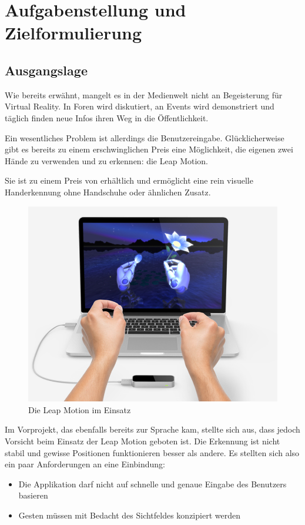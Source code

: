 \chapter{Aufgabenstellung und Zielformulierung}

\section{Ausgangslage}

Wie bereits erwähnt, mangelt es in der Medienwelt nicht an Begeisterung für Virtual Reality. In Foren wird diskutiert, an Events wird demonstriert und täglich finden neue Infos ihren Weg in die Öffentlichkeit.

Ein wesentliches Problem ist allerdings die Benutzereingabe. Glücklicherweise gibt es bereits zu einem erschwinglichen Preis eine Möglichkeit, die eigenen zwei Hände zu verwenden und zu erkennen: die Leap Motion.

Sie ist zu einem Preis von  erhältlich \cite{leap} und ermöglicht eine rein visuelle Handerkennung ohne Handschuhe oder ähnlichen Zusatz.

\begin{figure}[h]
	\centering
	\includegraphics[width=0.5\linewidth]{bilder/leap_example}
	\caption{Die Leap Motion im Einsatz}
	\label{fig:leap_example}
\end{figure}

Im Vorprojekt, das ebenfalls bereits zur Sprache kam, stellte sich aus, dass jedoch Vorsicht beim Einsatz der Leap Motion geboten ist. Die Erkennung ist nicht stabil und gewisse Positionen funktionieren besser als andere. Es stellten sich also ein paar Anforderungen an eine Einbindung:

\begin{itemize}
	\item Die Applikation darf nicht auf schnelle und genaue Eingabe des Benutzers basieren
	\item Gesten müssen mit Bedacht des Sichtfeldes konzipiert werden
\end{itemize}

